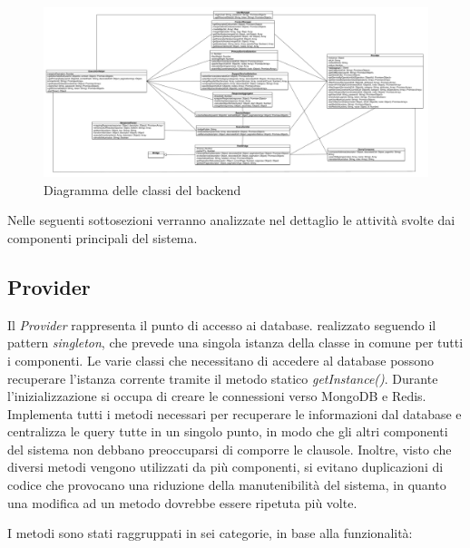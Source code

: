 \begin{figure}[ht]
	\hspace*{-2.2cm}
	\centering
	\includegraphics[width=1.4\textwidth]{5-implementazione-backend/Immagini/diagramma_classi_backend.png}
	\caption{Diagramma delle classi del backend}\label{fig:class-diagram-backend}
\end{figure}

Nelle seguenti sottosezioni verranno analizzate nel dettaglio le attività svolte dai componenti principali del sistema.

\subsection{Provider\label{sec:provider}}

Il \emph{Provider} rappresenta il punto di accesso ai database. \upe realizzato seguendo il pattern \emph{singleton}, che prevede una singola istanza della classe in comune per tutti i componenti. Le varie classi che necessitano di accedere al database possono recuperare l'istanza corrente tramite il metodo statico \emph{getInstance()}. Durante l'inizializzazione si occupa di creare le connessioni verso MongoDB e Redis. Implementa tutti i metodi necessari per recuperare le informazioni dal database e centralizza le query tutte in un singolo punto, in modo che gli altri componenti del sistema non debbano preoccuparsi di comporre le clausole. Inoltre, visto che diversi metodi vengono utilizzati da più componenti, si evitano duplicazioni di codice che provocano una riduzione della manutenibilità del sistema, in quanto una modifica ad un metodo dovrebbe essere ripetuta più volte.

I metodi sono stati raggruppati in sei categorie, in base alla funzionalità:

